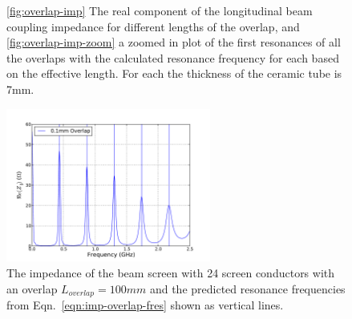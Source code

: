 \begin{figure}
\caption{\ref{fig:overlap-imp} The real component of the longitudinal beam coupling impedance for different lengths of the overlap, and \ref{fig:overlap-imp-zoom} a zoomed in plot of the first resonances of all the overlaps with the calculated resonance frequency for each based on the effective length. For each the thickness of the ceramic tube is 7mm.}
\label{fig:mki-overlap-imp-tot}
\end{figure}

\begin{figure}
\begin{center}
\includegraphics[width=0.6\textwidth]{LHC_MKI/figures/mki-overlap-fres-100mm.pdf}
\end{center}
\caption{The impedance of the beam screen with 24 screen conductors with an overlap $L_{overlap}=100mm$ and the predicted resonance frequencies from Eqn.~\ref{eqn:imp-overlap-fres} shown as vertical lines.}
\label{fig:imp-overlap-fres}
\end{figure}

